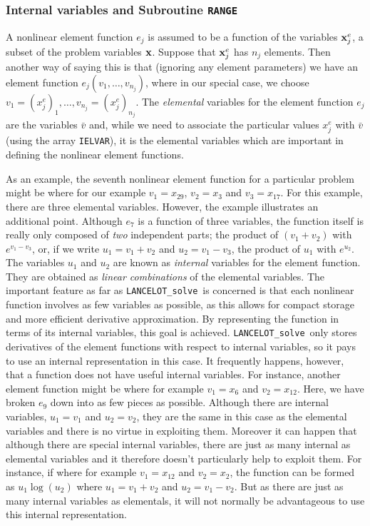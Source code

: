 \documentclass{galahad}
\newcommand{\fullpackagename}{LANC\-E\-LOT}
\newcommand{\solver}{{\tt \fullpackagename\_solve}}
\begin{document}

\subsubsection{\label{internal_and_ranges}Internal variables and
Subroutine {\tt RANGE}}

A nonlinear element function $e_j$ is assumed to be a function of
the variables ${\mathbf{x}}^e_j$, a subset of the problem variables
${\mathbf{x}}$. Suppose that ${\mathbf{x}}^e_j$ has $n_j$ elements. Then
another way of saying this is that (ignoring any element parameters)
we have an element function $e_j( v_1, \ldots, v_{n_j})$, where
in our special case, we choose
$v_1= (x^e_j)_1, \ldots, v_{n_j}= (x^e_j)_{n_j}$.
The {\em elemental} variables
for the element function $e_j$ are the variables
$\bar{v}$ and, while we need to associate the particular values
$x^e_j$ with $\bar{v}$ (using the array {\tt IELVAR}),
it is the elemental variables which
are important in defining the nonlinear element functions.

As an example, the seventh nonlinear element function for a
particular problem might be
where for our example
$v_1 = x_{29}$, $ v_2 = x_3$ and $v_3 = x_{17}$.
For this example, there are three elemental variables.
However, the
example illustrates an additional point. Although $e_7$ is
a function of three variables, the function itself is really
only composed of {\em two} independent parts; the product of
$(v_1 + v_2)$ with $e^{v_1 - v_3}$, or, if we write
$u_1 = v_1 + v_2$ and $u_2 = v_1 - v_3$, the product of
$u_1$ with $e^{u_2}$.
The variables $u_1$ and $u_2$ are known as {\em internal}
variables
for the element function.
They are obtained as {\em linear combinations} of the elemental variables.
The
important feature as far as \solver\ is concerned is that each
nonlinear function involves as few variables as possible, as
this allows for compact storage and more efficient derivative
approximation. By representing the function in terms of its internal
variables, this goal is achieved.
\solver\ only stores derivatives of the element
functions with respect to internal variables, so it pays to
use an internal representation in this case.
It frequently happens,
however, that a function does not have useful internal variables.
For instance, another element function
might be
where for example $ v_1 = x_6$ and $v_2 = x_{12}$.
Here, we have broken $e_9$ down into as few pieces as possible.
Although there are internal variables,
$u_1 = v_1$ and $u_2 = v_2$,
they are the same in this
case as the elemental variables
and there is no virtue in exploiting them.
Moreover it can happen that although there are
special internal variables,
there are just as many internal as elemental
variables and it therefore doesn't particularly
help to exploit them.
For instance, if
where for example
$v_1 = x_{12}$ and $ v_2 = x_2$, the function can be formed as
$u_1 \log(u_2)$ where $u_1 = v_1 + v_2$ and $u_2 = v_1 - v_2$.
But as there are just
as many internal variables as elementals, it will not normally be
advantageous to use this internal representation.
\end{document}
